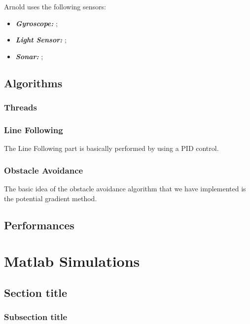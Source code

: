 \documentclass[a4paper,11pt,oneside]{book}
\begin{document}
Arnold uses the following sensors:
\begin{itemize}
	\item \textit{ \textbf {Gyroscope:} };
	\item \textit{\textbf {Light Sensor:} };
	\item \textit{\textbf {Sonar:} };
	
\end{itemize}

\section{Algorithms}
\subsection {Threads}
\subsection {Line Following}

The Line Following part is basically performed by using a PID control.

\subsection {Obstacle Avoidance}

The basic idea of the obstacle avoidance algorithm that we have implemented is the potential gradient method.

\section{Performances}






\chapter{Matlab Simulations}

\section{Section title}
\subsection {Subsection title}







{}

\end{document}
